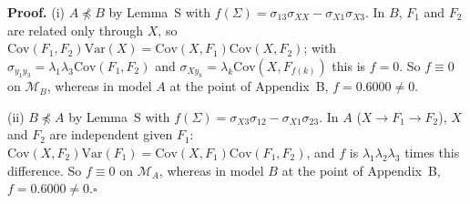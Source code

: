 \documentclass[10pt,a4paper]{article}
\newcommand{\nnest}{\not\preceq}
\begin{document}
\noindent\textbf{Proof.} (i) $A\nnest B$ by Lemma~S with $f(\Sigma)=\sigma_{13}\sigma_{XX} - \sigma_{X1}\sigma_{X3}$. In $B$, $F_1$ and $F_2$ are related only through $X$, so $\mathrm{Cov}(F_1,F_2)\mathrm{Var}(X)=\mathrm{Cov}(X,F_1)\mathrm{Cov}(X,F_2)$; with $\sigma_{y_1y_3}=\lambda_1\lambda_3\mathrm{Cov}(F_1,F_2)$ and $\sigma_{Xy_k}=\lambda_k\mathrm{Cov}(X,F_{f(k)})$ this is $f=0$. So $f\equiv0$ on $\mathcal M_B$, whereas in model $A$ at the point of Appendix~B, $f=0.6000\neq0$.\par\smallskip
\noindent(ii) $B\nnest A$ by Lemma~S with $f(\Sigma)=\sigma_{X3}\sigma_{12} - \sigma_{X1}\sigma_{23}$. In $A$ ($X\to F_1\to F_2$), $X$ and $F_2$ are independent given $F_1$: $\mathrm{Cov}(X,F_2)\mathrm{Var}(F_1)=\mathrm{Cov}(X,F_1)\mathrm{Cov}(F_1,F_2)$, and $f$ is $\lambda_1\lambda_2\lambda_3$ times this difference. So $f\equiv0$ on $\mathcal M_A$, whereas in model $B$ at the point of Appendix~B, $f=0.6000\neq0$.\hfill$\square$\par\medskip
{}

\clearpage
\end{document}
